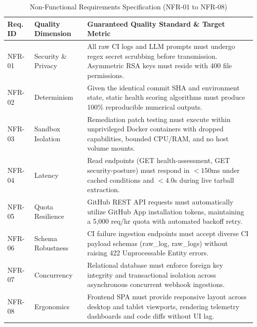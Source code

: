 \documentclass[12pt,a4paper,oneside]{report}
\begin{document}
\begin{table}[htbp]
    \centering
    \caption{Non-Functional Requirements Specification (NFR-01 to NFR-08)}
    \label{tab:non-functional-requirements}
    \small
    \begin{tabularx}{\textwidth}{p{} p{} p{}}
        \toprule
        \textbf{Req. ID} & \textbf{Quality Dimension} & \textbf{Guaranteed Quality Standard \& Target Metric} \\
        \midrule
        NFR-01 & Security \& Privacy & All raw CI logs and LLM prompts must undergo regex secret scrubbing before transmission. Asymmetric RSA keys must reside with 400 file permissions. \\
        \addlinespace
        NFR-02 & Determinism & Given the identical commit SHA and environment state, static health scoring algorithms must produce 100\% reproducible numerical outputs. \\
        \addlinespace
        NFR-03 & Sandbox Isolation & Remediation patch testing must execute within unprivileged Docker containers with dropped capabilities, bounded CPU/RAM, and no host volume mounts. \\
        \addlinespace
        NFR-04 & Latency & Read endpoints (GET health-assessment, GET security-posture) must respond in $< 150$ms under cached conditions and $< 4.0$s during live tarball extraction. \\
        \addlinespace
        NFR-05 & Quota Resilience & GitHub REST API requests must automatically utilize GitHub App installation tokens, maintaining a 5,000 req/hr quota with automated backoff retry. \\
        \addlinespace
        NFR-06 & Schema Robustness & CI failure ingestion endpoints must accept diverse CI payload schemas (raw\_log, raw\_logs) without raising 422 Unprocessable Entity errors. \\
        \addlinespace
        NFR-07 & Concurrency & Relational database must enforce foreign key integrity and transactional isolation across asynchronous concurrent webhook ingestions. \\
        \addlinespace
        NFR-08 & Ergonomics & Frontend SPA must provide responsive layout across desktop and tablet viewports, rendering telemetry dashboards and code diffs without UI lag. \\
        \bottomrule
    \end{tabularx}
\end{table}
\end{document}

